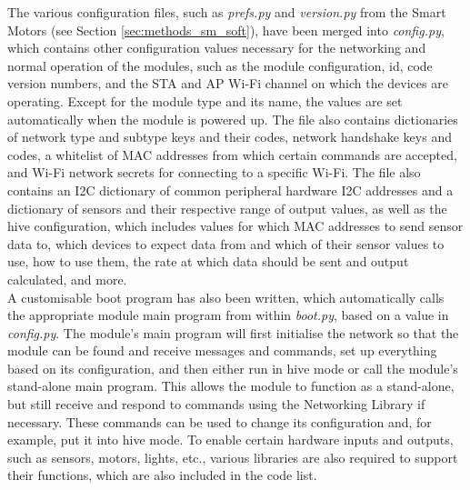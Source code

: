 The various configuration files, such as \textit{prefs.py} and \textit{version.py} from the Smart Motors (see Section \ref{sec:methods_sm_soft}), have been merged into \textit{config.py}, which contains other configuration values necessary for the networking and normal operation of the modules, such as the module configuration, id, code version numbers, and the STA and AP Wi-Fi channel on which the devices are operating. Except for the module type and its name, the values are set automatically when the module is powered up.  The file also contains dictionaries of network type and subtype keys and their codes, network handshake keys and codes, a whitelist of MAC addresses from which certain commands are accepted, and Wi-Fi network secrets for connecting to a specific Wi-Fi. The file also contains an I2C dictionary of common peripheral hardware I2C addresses and a dictionary of sensors and their respective range of output values, as well as the hive configuration, which includes values for which MAC addresses to send sensor data to, which devices to expect data from and which of their sensor values to use, how to use them, the rate at which data should be sent and output calculated, and more.\\

A customisable boot program has also been written, which automatically calls the appropriate module main program from within \textit{boot.py}, based on a value in \textit{config.py}. The module's main program will first initialise the network so that the module can be found and receive messages and commands, set up everything based on its configuration, and then either run in hive mode or call the module's stand-alone main program. This allows the module to function as a stand-alone, but still receive and respond to commands using the Networking Library if necessary. These commands can be used to change its configuration and, for example, put it into hive mode. To enable certain hardware inputs and outputs, such as sensors, motors, lights, etc., various libraries are also required to support their functions, which are also included in the code list.

